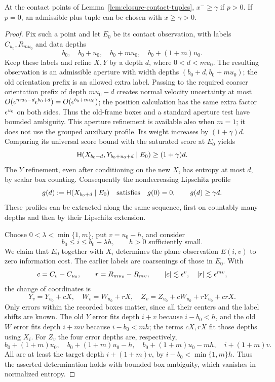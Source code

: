 \begin{lemma}
\label{lem:closure-positive-x}
At the contact points of Lemma~\ref{lem:closure-contact-tuples},
$x^-\ge\gamma$ if $p>0$.  If $p=0$, an admissible plus tuple can be
chosen with $x\ge\gamma>0$.
\end{lemma}

\begin{proof}
Fix such a point and let $E_0$ be its contact observation, with labels
$C_{u_0},R_{mu_0}$ and data depths
\[
 b_0,\quad b_0+u_0,\quad b_0+mu_0,\quad b_0+(1+m)u_0.
\]
Keep these labels and refine $X,Y$ by a depth $d$, where
$0<d<mu_0$.  The resulting observation is an admissible aperture with
width depths $(b_0+d,b_0+mu_0)$; the old orientation prefix is an
allowed extra label.  Passing to the required coarser orientation
prefix of depth $mu_0-d$ creates normal velocity uncertainty at most
$O(\epsilon^{mu_0-d}\epsilon^{b_0+d})=O(\epsilon^{b_0+mu_0})$; the position
calculation has the same extra factor $\epsilon^{u_0}$ on both sides.
Thus the old-frame boxes and a standard aperture test have bounded
ambiguity.  This aperture refinement is available also when $m=1$;
it does not use the grouped auxiliary profile.  Its weight increases
by $(1+\gamma)d$.
Comparing its universal score bound with the saturated score at
$E_0$ yields
\[
 \mathsf H(X_{b_0+d},Y_{b_0+u_0+d}\mid E_0)\ge(1+\gamma)d.
\]
The $Y$ refinement, even after conditioning on the new $X$, has
entropy at most $d$, by scalar box counting.  Consequently the
nondecreasing Lipschitz profile
\begin{equation}
 g(d):=\mathsf H(X_{b_0+d}\mid E_0)
 \quad\text{satisfies}\quad g(0)=0,\qquad g(d)\ge\gamma d.
 \label{eq:closure-x-entropy}
\end{equation}
These profiles can be extracted along the same sequence, first on
countably many depths and then by their Lipschitz extension.

Choose $0<\lambda<\min\{1,m\}$, put $v=u_0-h$, and consider
\begin{equation}
 b_0\le i\le b_0+\lambda h,
 \qquad h>0\text{ sufficiently small}.
 \label{eq:closure-x-wedge}
\end{equation}
We claim that $E_0$ together with $X_i$ determines the plane
observation $E(i,v)$ to zero information cost.  The earlier labels
are coarsenings of those in $E_0$.  With
\[
 c=C_v-C_{u_0},\qquad r=R_{mu_0}-R_{mv},
 \qquad |c|\lesssim\epsilon^v,\quad |r|\lesssim\epsilon^{mv},
\]
the change of coordinates is
\[
 Y_v=Y_{u_0}+cX,\quad W_v=W_{u_0}+rX,\quad
 Z_v=Z_{u_0}+cW_{u_0}+rY_{u_0}+crX.
\]
Only errors within the recorded boxes matter, since all their centers
and the label shifts are known.  The old $Y$ error fits depth $i+v$
because $i-b_0<h$, and the old $W$ error fits depth $i+mv$ because
$i-b_0<mh$; the terms $cX,rX$ fit those depths using $X_i$.
For $Z_v$ the four error depths are, respectively,
\[
 b_0+(1+m)u_0,\quad b_0+(1+m)u_0-h,\quad
 b_0+(1+m)u_0-mh,\quad i+(1+m)v.
\]
All are at least the target depth $i+(1+m)v$, by
$i-b_0<\min\{1,m\}h$.  Thus the asserted determination holds with
bounded box ambiguity, which vanishes in normalized entropy.


\end{proof}

